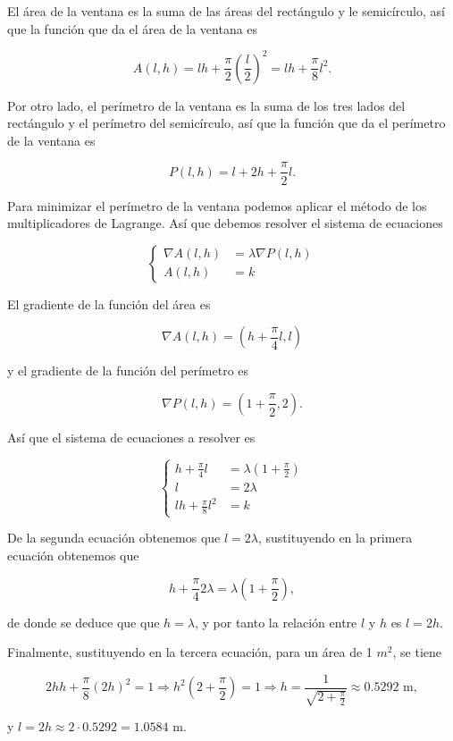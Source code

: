 \documentclass[
  spanish,
  a4paper,
]{scrreport}
\theoremstyle{definition}
\theoremstyle{remark}
\begin{document}
\begin{tcolorbox}[enhanced jigsaw, colbacktitle=quarto-callout-tip-color!10!white, opacityback=0, toptitle=1mm, title=\textcolor{quarto-callout-tip-color}{\faLightbulb}\hspace{0.5em}{Solución}, coltitle=black, opacitybacktitle=0.6, breakable, toprule=.15mm, leftrule=.75mm, titlerule=0mm, colframe=quarto-callout-tip-color-frame, left=2mm, bottomrule=.15mm, bottomtitle=1mm, arc=.35mm, rightrule=.15mm, colback=white]

El área de la ventana es la suma de las áreas del rectángulo y le
semicírculo, así que la función que da el área de la ventana es

\[
A(l,h)=lh+\frac{\pi}{2}\left(\frac{l}{2}\right)^2 = lh + \frac{\pi}{8}l^2.
\]

Por otro lado, el perímetro de la ventana es la suma de los tres lados
del rectángulo y el perímetro del semicírculo, así que la función que da
el perímetro de la ventana es

\[
P(l,h)=l+2h+\frac{\pi}{2}l.
\]

Para minimizar el perímetro de la ventana podemos aplicar el método de
los multiplicadores de Lagrange. Así que debemos resolver el sistema de
ecuaciones

\[
\begin{cases}
\nabla A(l,h) &= \lambda \nabla P(l,h) \\
A(l,h) &= k
\end{cases}
\]

El gradiente de la función del área es

\[
\nabla A(l,h) = \left( h + \frac{\pi}{4}l,  l\right)
\]

y el gradiente de la función del perímetro es

\[
\nabla P(l,h) = \left( 1 + \frac{\pi}{2}, 2\right).
\]

Así que el sistema de ecuaciones a resolver es

\[
\begin{cases}
h + \frac{\pi}{4}l &= \lambda \left( 1 + \frac{\pi}{2}\right) \\
l &= 2\lambda \\
lh + \frac{\pi}{8}l^2 &= k
\end{cases}
\]

De la segunda ecuación obtenemos que \(l=2\lambda\), sustituyendo en la
primera ecuación obtenemos que

\[
h + \frac{\pi}{4}2\lambda = \lambda \left( 1 + \frac{\pi}{2}\right),
\]

de donde se deduce que que \(h = \lambda\), y por tanto la relación
entre \(l\) y \(h\) es \(l=2h\).

Finalmente, sustituyendo en la tercera ecuación, para un área de 1
\(m^2\), se tiene

\[
2hh + \frac{\pi}{8}(2h)^2 = 1 
\Rightarrow h^2\left( 2 + \frac{\pi}{2}\right) = 1 
\Rightarrow h = \frac{1}{\sqrt{2 + \frac{\pi}{2}}}
\approx 0.5292 \mbox{ m},
\]

y \(l = 2h \approx 2\cdot 0.5292 = 1.0584\) m.

\end{tcolorbox}
\end{document}
